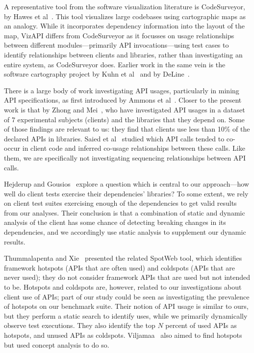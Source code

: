 \label{sec:related-work}
A representative tool from the software visualization literature is
CodeSurveyor, by Hawes et al~\cite{hawes15:_codes}. This tool visualizes large
codebases using cartographic maps as an analogy.  While it
incorporates dependency information into the layout of the map, VizAPI
differs from CodeSurveyor as it focusses on usage relationships
between different modules---primarily API invocations---using test
cases to identify relationships between clients and libraries, rather
than investigating an entire system, as CodeSurveyor does.  Earlier
work in the same vein is the software cartography project by Kuhn et
al~\cite{kuhn10:_softw} and by DeLine~\cite{deline05:_stayin}.




There is a large body of work investigating API usages, particularly
in mining API specifications, as first introduced by Ammons et
al~\cite{AmmonsETAL02MiningSpecifications}. Closer to the present work
is that by Zhong and Mei~\cite{zhong19:_empir_study_api_usages}, who
have investigated API usages in a dataset of 7 experimental subjects
(clients) and the libraries that they depend on. Some of those
findings are relevant to us: they find that clients use less than 10\%
of the declared APIs in libraries. Saied et
al~\cite{saied15:_minin_multi_api_usage_patter} studied which API
calls tended to co-occur in client code and inferred co-usage
relationships between these calls. Like them, we are specifically not
investigating sequencing relationships between API calls.

Hejderup and Gousios~\cite{DBLP:journals/jss/HejderupG22} explore a
question which is central to our approach---how well do client tests
exercise their dependencies' libraries? To some extent, we rely on
client test suites exercising enough of the dependencies to get valid
results from our analyses. Their conclusion is that a combination of
static and dynamic analysis of the client has some chance of detecting
breaking changes in its dependencies, and we accordingly use static
analysis to supplement our dynamic results.

Thummalapenta and Xie~\cite{thummalapenta08:_spotw} presented the
related SpotWeb tool, which identifies framework hotspots (APIs that
are often used) and coldspots (APIs that are never used); they do not
consider framework APIs that are used but not intended to be. Hotspots
and coldspots are, however, related to our investigations about client
use of APIs; part of our study could be seen as investigating the
prevalence of hotspots on our benchmark suite. Their notion of API
usage is similar to ours, but they perform a static search to identify
uses, while we primarily dynamically observe test executions. They
also identify the top $N$ percent of used APIs as hotspots, and unused
APIs as
coldspots. Viljamaa~\cite{viljamaa03:_rever_engin_framew_reuse_inter}
also aimed to find hotspots but used concept analysis to do so.

